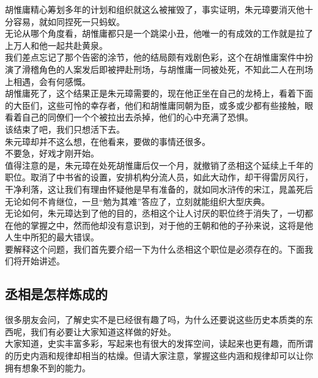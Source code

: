 \begin{multicols}{\theparacolNo}
胡惟庸精心筹划多年的计划和组织就这么被摧毁了，事实证明，朱元璋要消灭他十分容易，就如同捏死一只蚂蚁。\\

无论从哪个角度看，胡惟庸都只是一个跳梁小丑，他唯一的有成效的工作就是拉了上万人和他一起共赴黄泉。\\

我们差点忘记了那个告密的涂节，他的结局颇有戏剧色彩，这个在胡惟庸案件中扮演了滑稽角色的人案发后即被押赴刑场，与胡惟庸一同被处死，不知此二人在刑场上相遇，会有何感慨。\\

胡惟庸死了，这个结果正是朱元璋需要的，现在他正坐在自己的龙椅上，看着下面的大臣们，这些可怜的幸存者，他们和胡惟庸同朝为臣，或多或少都有些接触，眼看着自己的同僚们一个个被拉出去杀掉，他们的心中充满了恐惧。\\

该结束了吧，我们只想活下去。\\

朱元璋却并不这么想，在他看来，要做的事情还很多。\\

不要急，好戏才刚开始。\\

值得注意的是，朱元璋在处死胡惟庸后仅一个月，就撤销了丞相这个延续上千年的职位。取消了中书省的设置，安排机构分流人员，如此大动作，却干得雷厉风行，干净利落，这让我们有理由怀疑他是早有准备的，就如同水浒传的宋江，晁盖死后无论如何不肯继位，一旦“勉为其难”答应了，立刻就能组织大型庆典。\\

无论如何，朱元璋达到了他的目的，丞相这个让人讨厌的职位终于消失了，一切都在他的掌握之中，然而他却没有意识到，对于他的王朝和他的子孙来说，这将是他人生中所犯的最大错误。\\

要解释这个问题，我们首先要介绍一下为什么丞相这个职位是必须存在的。下面我们将开始讲述。\\

\subsection{丞相是怎样炼成的}
很多朋友会问，了解史实不是已经很有趣了吗，为什么还要说这些历史本质类的东西呢，我们有必要让大家知道这样做的好处。\\

大家知道，史实丰富多彩，写起来也有很大的发挥空间，读起来也更有趣，而所谓的历史内涵和规律却相当的枯燥。但请大家注意，掌握这些内涵和规律却可以让你拥有想象不到的能力。\\


\end{multicols}
